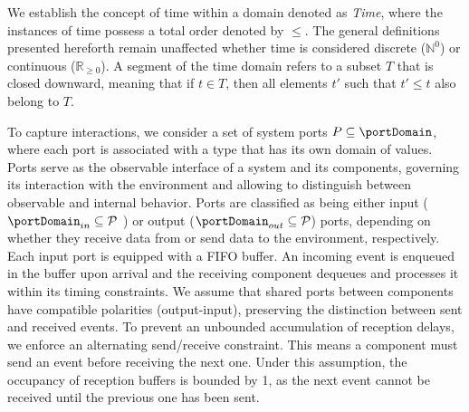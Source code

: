 %
%

We establish the concept of {time} within a domain denoted as \emph{Time}, where the instances of time possess a total order denoted by $\leq$. The general definitions presented hereforth remain unaffected whether time is considered discrete (\(\mathbb{N}^0\)) or continuous (\(\mathbb{R}_{\geq 0}\)). A segment of the time domain refers to a subset $T$ that is closed downward, meaning that if $t \in T$, then all elements $t'$ such that $t'\leq t$ also belong to $T$. %



To capture interactions, we consider a set of system ports $P \subseteq \portDomain$, where each port is associated with a type that has its own domain of values. Ports serve as the observable interface of a system and its components, governing its interaction with the environment and allowing to distinguish between observable and internal behavior.  Ports are classified as being either {input} ($\portDomain_{in} \subseteq \mathcal{P}$ ) or {output} ($\portDomain_{out}\subseteq \mathcal{P}$) ports, depending on whether they receive data from or send data to the environment, respectively. 
Each input port is equipped with a FIFO buffer. An incoming event is enqueued in the buffer upon arrival and the receiving component dequeues and processes it within its timing constraints. We assume that shared ports between components have compatible polarities (output-input), preserving the distinction between sent and received events. To prevent an unbounded accumulation of reception delays, we enforce an {alternating send/receive constraint}. This means a component must send an event before receiving the next one. Under this assumption, the occupancy of reception buffers is bounded by 1, as the next event cannot be received until the previous one has been sent. 






